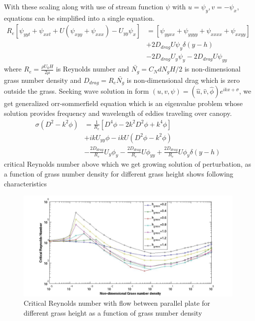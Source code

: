 \documentclass[aps,preprint,floatfix,prl]{revtex4-1}
\begin{document}
With these scaling along with use of stream function $\psi$ with $u = \psi_{y}, v= -\psi_x$, equations can be simplified into a single equation.
\begin{equation}
\begin{split}
 R_{e}\left[\psi_{yyt}+\psi_{xxt}+U\left(\psi_{xyy}+\psi_{xxx}\right)-U_{yy}\psi_{x} \right] &=\left[\psi_{yyxx}+\psi_{yyyy}+\psi_{xxxx}+\psi_{xxyy} \right]\\
& + 2D_{drag}U\psi_{y}\delta(y-h)\\
& - 2D_{drag}U_{y}\psi_{y} -2D_{drag}U\psi_{yy}
\end{split}
\end{equation}
where $R_{e}= \frac{\rho U_0 H}{2\mu}$ is Reynolds number and $\bar{N_g} = C_N d N_g H/2$ is non-dimensional grass number density and  $D_{drag} = R_{e}\bar{N_{g}}$ is non-dimensional drag
which is zero outside the grass. Seeking wave solution in form $\left(u,v,\psi \right)= \left(\hat u, \hat v, \hat\phi \right)e^{ikx+\sigma}$, we get generalized orr-sommerfield equation 
which is an eigenvalue problem whose solution provides frequency and wavelength of eddies traveling over canopy.
\begin{equation}
\begin{split}
\sigma \left(D^2-k^2\phi \right) &= \frac{1}{R_{e}}\left[D^4\phi -2k^{2}D^2\phi +k^{4}\phi \right]\\
				  & +ikU_{yy}\phi-ikU\left(D^2\phi-k^2\phi \right)\\
 & -\frac{2D_{drag}}{R_{e}}U_{y}\phi_{y}-\frac{2D_{drag}}{R_{e}}U\phi_{yy}+\frac{2D_{drag}}{R_{e}}U\phi_{y}\delta(y-h)
\end{split}
\end{equation}
critical Reynolds number above which we get growing solution of perturbation, as a function of grass number density for different grass height shows following characteristics 
  \begin{figure}[htb!]
  \includegraphics[scale=0.35]{Instability2}
\caption{Critical Reynolds number with flow between parallel plate for different grass height as a function of grass number density}
\end{figure}
\end{document}
